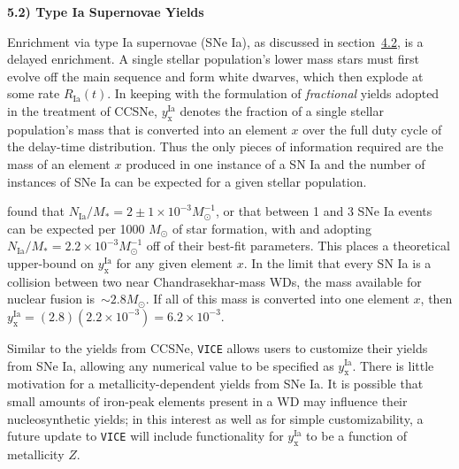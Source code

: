 \documentclass{report}
\begin{document}
\null\par\noindent
\hypertarget{sec:sneia_yields}{\textbf{5.2) Type Ia Supernovae Yields}}
\par\noindent 
Enrichment via type Ia supernovae (SNe Ia), as discussed in 
section~\hyperlink{sec:sneia}{4.2}, is a delayed enrichment. A single stellar 
population's lower mass stars must first evolve off the main sequence and form 
white dwarves, which then explode at some rate $R_\text{Ia}(t)$. In keeping 
with the formulation of \textit{fractional} yields adopted in the treatment of 
CCSNe, $y_\text{x}^\text{Ia}$ denotes the fraction of a single stellar 
population's mass that is converted into an element $x$ over the full duty 
cycle of the delay-time distribution. Thus the only pieces of information 
required are the mass of an element $x$ produced in one instance of a 
SN Ia and the number of instances of SNe Ia can be expected for a given 
stellar population. 
\par
\citet{Maoz2012} found that $N_\text{Ia}/M_* = 2\pm1\times10^{-3} M_\odot^{-1}$, 
or that between 1 and 3 SNe Ia events can be expected per 1000 $M_\odot$ of 
star formation, with \citet{Andrews2017} and \citet{Weinberg2017} adopting 
$N_\text{Ia}/M_* = 2.2\times10^{-3} M_\odot^{-1}$ off of their best-fit 
parameters. This places a theoretical upper-bound on $y_\text{x}^\text{Ia}$ for 
any given element $x$. In the limit that every SN Ia is a collision between 
two near Chandrasekhar-mass WDs, the mass available for nuclear fusion 
is~$\sim2.8 M_\odot$. If all of this mass is converted into one element $x$, 
then $y_\text{x}^\text{Ia} = (2.8)(2.2\times10^{-3}) = 6.2\times10^{-3}$. 
\par
Similar to the yields from CCSNe, \texttt{VICE} allows users to customize 
their yields from SNe Ia, allowing any numerical value to be specified as 
$y_\text{x}^\text{Ia}$. There is little motivation for a metallicity-dependent 
yields from SNe Ia. It is possible that small amounts of iron-peak elements 
present in a WD may influence their nucleosynthetic yields; in this interest 
as well as for simple customizability, a future update to \texttt{VICE} will 
include functionality for $y_\text{x}^\text{Ia}$ to be a function of 
metallicity $Z$. 
\par
\end{document}

